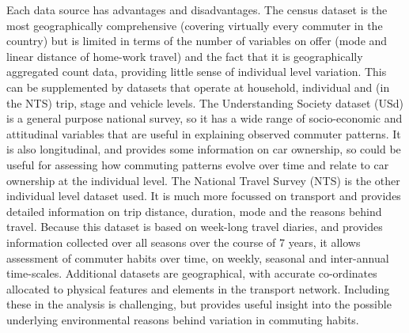 \documentclass[a4paper, 11pt, twoside]{Thesis}
\begin{document}
Each data source has advantages and disadvantages.
The census dataset is the most geographically comprehensive 
(covering virtually every commuter in the country) but is limited in terms of
the number of variables on offer (mode and linear distance of home-work
travel) and the fact that it is geographically aggregated count data, providing
little sense of individual level variation. This can be supplemented by datasets
that operate at household, individual and (in the NTS) trip, stage and
vehicle levels. The Understanding Society dataset (USd) is a general purpose
national survey, so it has a wide range of socio-economic and attitudinal variables
that are useful in explaining observed commuter patterns. It is also
longitudinal, and provides some information on car ownership, so could be
useful for assessing how commuting patterns evolve over time and relate to car
ownership at the individual
level. The National Travel Survey (NTS) is the other individual level dataset
used. It is
much more focussed on transport and
provides detailed information on trip distance, duration, mode and the
reasons behind travel. Because this dataset is based on
week-long travel diaries, and provides information collected over all seasons
over the course of 7 years, it allows assessment of commuter habits over time,
on weekly, seasonal and inter-annual time-scales. Additional datasets are
geographical, with accurate co-ordinates allocated to physical features and
elements in the transport network. Including these
in the analysis is challenging, but provides useful insight into the possible
underlying environmental reasons behind variation in commuting habits.
\end{document}
